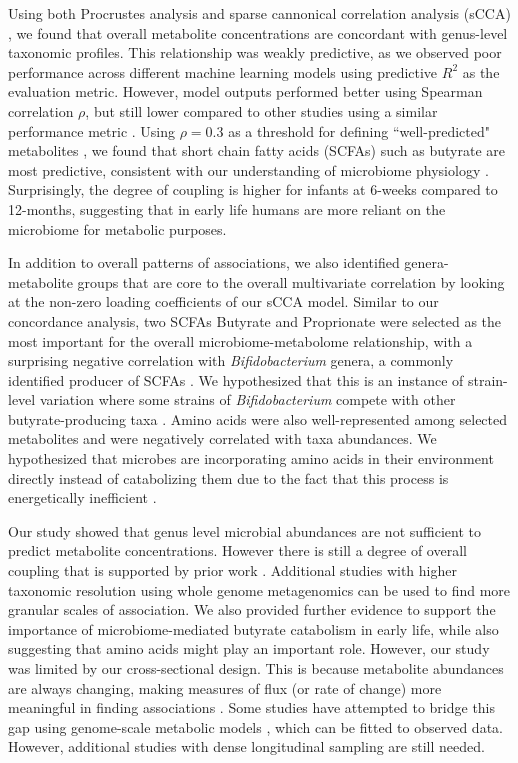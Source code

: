 Using both Procrustes analysis and sparse cannonical correlation analysis (sCCA) \cite{witten2009penalized}, we found that overall metabolite concentrations are concordant with genus-level taxonomic profiles. This relationship was weakly predictive, as we observed poor performance across different machine learning models using predictive $R^2$ as the evaluation metric. However, model outputs performed better using Spearman correlation $\rho$, but still lower compared to other studies using a similar performance metric \cite{mallick2019predictive}. Using $\rho = 0.3$ as a threshold for defining ``well-predicted" metabolites \cite{mallick2019predictive, muller2021metaanalysis}, we found that short chain fatty acids (SCFAs) such as butyrate are most predictive, consistent with our understanding of microbiome physiology \cite{leblanc2017beneficial}. Surprisingly, the degree of coupling is higher for infants at 6-weeks compared to 12-months, suggesting that in early life humans are more reliant on the microbiome for metabolic purposes. 

In addition to overall patterns of associations, we also identified genera-metabolite groups that are core to the overall multivariate correlation by looking at the non-zero loading coefficients of our sCCA model. Similar to our concordance analysis, two SCFAs Butyrate and Proprionate were selected as the most important for the overall microbiome-metabolome relationship, with a surprising negative correlation with \emph{Bifidobacterium} genera, a commonly identified producer of SCFAs \cite{james2019metabolism}. We hypothesized that this is an instance of strain-level variation where some strains of \emph{Bifidobacterium} compete with other butyrate-producing taxa \cite{riviere2016bifidobacteria}. Amino acids were also well-represented among selected metabolites and were negatively correlated with taxa abundances. We hypothesized that microbes are incorporating amino acids in their environment directly instead of catabolizing them due to the fact that this process is energetically inefficient \cite{franzosa2014relating, oliphant2019macronutrient}. 

Our study showed that genus level microbial abundances are not sufficient to predict metabolite concentrations. However there is still a degree of overall coupling that is supported by prior work \cite{ayeni2018infant, kisuse2018urban, zierer2018fecal}. Additional studies with higher taxonomic resolution using whole genome metagenomics can be used to find more granular scales of association. We also provided further evidence to support the importance of microbiome-mediated butyrate catabolism in early life, while also suggesting that amino acids might play an important role. However, our study was limited by our cross-sectional design. This is because metabolite abundances are always changing, making measures of flux (or rate of change) more meaningful in finding associations \cite{hollywood2006metabolomics}. Some studies have attempted to bridge this gap using genome-scale metabolic models \cite{noecker2019defining}, which can be fitted to observed data. However, additional studies with dense longitudinal sampling are still needed.   


